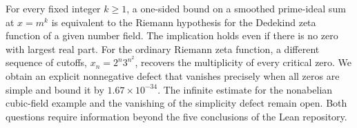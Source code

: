 \documentclass[11pt]{article}
\begin{document}
\noindent
For every fixed integer $k\ge1$, a one-sided bound on a smoothed prime-ideal sum at $x=m^k$ is equivalent to the Riemann hypothesis for the Dedekind zeta function of a given number field. The implication holds even if there is no zero with largest real part. For the ordinary Riemann zeta function, a different sequence of cutoffs, $x_n=2^n3^{n^2}$, recovers the multiplicity of every critical zero. We obtain an explicit nonnegative defect that vanishes precisely when all zeros are simple and bound it by $1.67\times10^{-34}$. The infinite estimate for the nonabelian cubic-field example and the vanishing of the simplicity defect remain open. Both questions require information beyond the five conclusions of the Lean repository.


\end{document}
